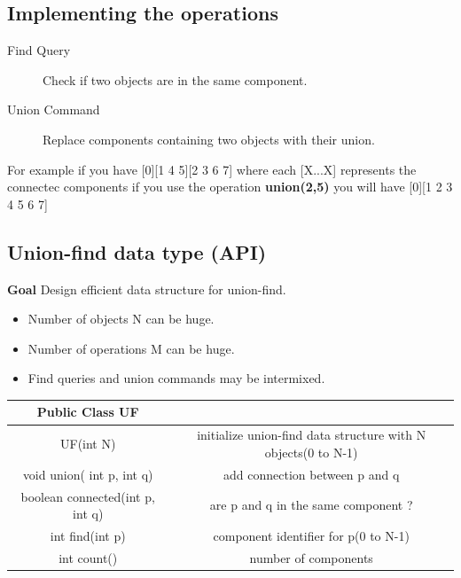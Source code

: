 \vspace{10 mm}

\subsection{Implementing the operations}
\begin{description}
  \item[Find Query] Check if two objects are in the same component.
  \item[Union Command] Replace components containing two objects with their union.
\end{description}
For example if you have [0][1 4 5][2 3 6 7] where each [X...X] represents the connectec components if you use the operation \textbf{union(2,5)}
you will have [0][1 2 3 4 5 6 7]


\subsection{Union-find data type (API)}

\textbf{Goal} Design efficient data structure for union-find.
\begin{itemize}
\item Number of objects N can be huge.
\item Number of operations M can be huge.
\item Find queries and union commands may be intermixed.
\end{itemize}


\begin{table}[h]
\begin{center}
\begin{tabular}{cc}
\textbf{Public Class UF}        & \multicolumn{1}{l}{}                                          \\ \hline
UF(int N)                       & initialize union-find data structure with N objects(0 to N-1) \\ \hline
void union( int p, int q)       & add connection between p and q                                \\ \hline
boolean connected(int p, int q) & are p and q in the same component ?                           \\ \hline
int find(int p)                 & component identifier for p(0 to N-1)                          \\ \hline
int count()                     & number of components                                          \\ \hline
\end{tabular}
\end{center}
\end{table}

